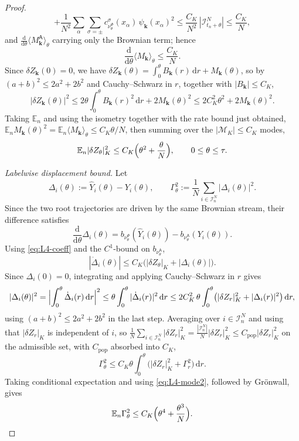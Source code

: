 \documentclass[a4paper,fleqn]{cas-sc}
\theoremstyle{definition}
\theoremstyle{remark}
\begin{document}
\begin{proof}
\[+\frac1{N^2}\sum_\alpha\sum_{\sigma=\pm}c^\sigma_{\nu^\Phi_\theta}(x_\alpha)\,\psi_{\mathbf k}(x_\alpha)^2
\le\frac{C_K}{N^2}\,|\mathcal I^N_{t_n+\theta}|\le\frac{C_K}N ,
\]
and $\tfrac{\mathrm d}{\mathrm d\theta}\langle M_{\mathbf k}^{\mathsf A}\rangle_\theta$ carrying only the
Brownian term; hence
\[
\frac{\mathrm d}{\mathrm d\theta}\langle M_{\mathbf k}\rangle_\theta\le\frac{C_K}{N}.
\]
Since $\delta Z_{\mathbf k}(0)=0$, we have
$\delta Z_{\mathbf k}(\theta)=\int_0^\theta B_{\mathbf k}(r)\,\mathrm dr+M_{\mathbf k}(\theta)$,
so by $(a+b)^2\le2a^2+2b^2$ and Cauchy--Schwarz in $r$, together with $|B_{\mathbf k}|\le C_K$,
\[
|\delta Z_{\mathbf k}(\theta)|^2
\le 2\theta\int_0^\theta B_{\mathbf k}(r)^2\,\mathrm dr+2M_{\mathbf k}(\theta)^2
\le 2C_K^2\theta^2+2M_{\mathbf k}(\theta)^2 .
\]
Taking $\mathbb E_n$ and using the isometry together with the rate bound just obtained,
$\mathbb E_nM_{\mathbf k}(\theta)^2=\mathbb E_n\langle M_{\mathbf k}\rangle_\theta\le C_K\theta/N$,
then summing over the $|\mathcal M_K|\le C_K$ modes,
\begin{equation}\label{eq:L4-mode2}
\mathbb E_n|\delta Z_\theta|_K^2\le C_K\Bigl(\theta^2+\frac{\theta}{N}\Bigr),\qquad 0\le\theta\le\tau .
\end{equation}

\medskip
\noindent\emph{Labelwise displacement bound.}
Let
\[
\Delta_i(\theta):=\widehat Y_i(\theta)-Y_i(\theta),\qquad
\Gamma_\theta^2:=\frac1N\sum_{i\in\mathcal I^N_n}|\Delta_i(\theta)|^2 .
\]
Since the two root trajectories are driven by the same Brownian stream, their difference
satisfies
\[
\frac{\mathrm d}{\mathrm d\theta}\Delta_i(\theta)
=b_{\nu^\Phi_\theta}(\widehat Y_i(\theta))-b_{\nu^{\mathsf A}_\theta}(Y_i(\theta)).
\]
Using \eqref{eq:L4-coeff} and the $C^1$-bound on $b_{\nu^{\mathsf A}_\theta}$,
\[
|\dot\Delta_i(\theta)|\le C_K\bigl(|\delta Z_\theta|_K+|\Delta_i(\theta)|\bigr).
\]
Since $\Delta_i(0)=0$, integrating and applying Cauchy--Schwarz in $r$ gives
\[
|\Delta_i(\theta)|^2
=\Bigl|\int_0^\theta\dot\Delta_i(r)\,\mathrm dr\Bigr|^2
\le\theta\int_0^\theta|\dot\Delta_i(r)|^2\,\mathrm dr
\le 2C_K^2\,\theta\int_0^\theta\bigl(|\delta Z_r|_K^2+|\Delta_i(r)|^2\bigr)\,\mathrm dr,
\]
using $(a+b)^2\le2a^2+2b^2$ in the last step. Averaging over $i\in\mathcal I^N_n$ and
using that $|\delta Z_r|_K$ is independent of $i$, so
$\frac1N\sum_{i\in\mathcal I^N_n}|\delta Z_r|_K^2=\frac{|\mathcal I^N_n|}{N}|\delta Z_r|_K^2\le C_{\mathrm{pop}}|\delta Z_r|_K^2$
on the admissible set, with $C_{\mathrm{pop}}$ absorbed into $C_K$,
\[
\Gamma_\theta^2\le C_K\theta\int_0^\theta\bigl(|\delta Z_r|_K^2+\Gamma_r^2\bigr)\,\mathrm dr .
\]
Taking conditional expectation and using \eqref{eq:L4-mode2}, followed by Gr\"onwall, gives
\begin{equation}\label{eq:L4-disp2}
\mathbb E_n\Gamma_\theta^2\le C_K\Bigl(\theta^4+\frac{\theta^3}{N}\Bigr).
\end{equation}


\end{proof}
\end{document}
